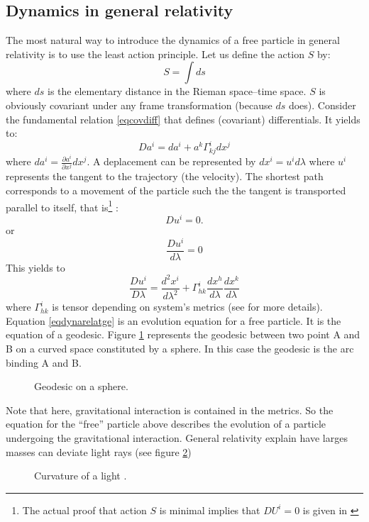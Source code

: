 \documentclass[12pt]{book}
\begin{document}
\subsection{Dynamics in general relativity}
The most natural way to introduce the dynamics of a free particle in
general relativity is to use the least action principle.
Let us define the action $S$ by:
\begin{equation}
S=\int ds
\end{equation}
where $ds$ is the elementary distance in the Rieman space--time
space. $S$ is obviously covariant under any frame transformation
(because $ds$ does). 
Consider the fundamental relation \ref{eqcovdiff} that defines
(covariant) differentials. It yields to:
\begin{equation}
Da^i=da^i+a^k\Gamma^i_{kj}dx^j
\end{equation}
where $da^i=\frac{\partial a^i}{\partial x^j}dx^j$.
A deplacement can be represented by $dx^i=u^id\lambda$ where $u^i$
represents the tangent to the trajectory (the velocity). 
The shortest path corresponds to a movement of the particle such the
the tangent is transported parallel to itself, that is\footnote{The
actual proof that action $S$ is minimal implies that $DU^i=0$ is given
in \cite{ph:relat:Misner73g,ma:tense:Brillouin64}}%
:
\begin{equation}
Du^i=0.
\end{equation}
or 
\begin{equation}
\frac{Du^i}{d\lambda}=0
\end{equation}
This yields to
\begin{equation}\label{eqdynarelatge} 
\frac{D u^i}{D\lambda}=\frac{d^2x^i}{d\lambda^2}+\Gamma^{i}_{hk}
\frac{dx^h}{d\lambda} \frac{dx^k}{d\lambda} 
\end{equation}
where $\Gamma^{i}_{hk}$ is tensor depending on system's metrics (see
\cite{ph:relat:Misner73g} for more details).
Equation \ref{eqdynarelatge} is an evolution equation for a free
particle. It is the equation of a geodesic. Figure \ref{figgeo}
represents the geodesic between two point A and B on a curved space
constituted by a sphere. In this case the geodesic is the arc binding
A and B. 

\begin{figure}[htb]
 \centerline{}   
 \caption{Geodesic on a sphere.} 
 \label{figgeo}
\end{figure}
Note that here, gravitational interaction is contained in the
metrics. So the equation for the ``free'' particle above describes the
evolution of a particle undergoing the gravitational interaction.
General relativity explain have larges masses can deviate light rays
(see figure \ref{figlightrayd})
\begin{figure}[htb]
 \centerline{}  
 \caption{Curvature of a light .} 
 \label{figlightrayd}
\end{figure}
\end{document}
